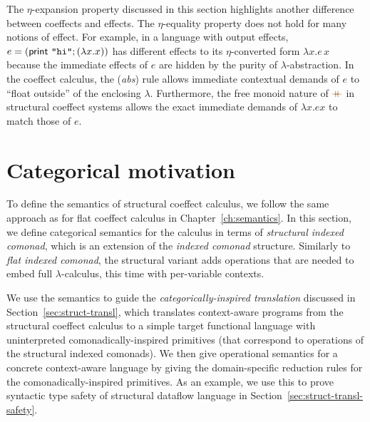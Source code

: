 \noindent
The $\eta$-expansion property discussed in this section highlights another difference
between coeffects and effects. The $\eta$-equality property does not hold for many notions
of effect. For example, in a language with output effects, $e = (\textsf{print \texttt{"hi"}}; (\lambda x . x))$
has different effects to its $\eta$-converted form $\lambda x . e\,x$ because the immediate
effects of $e$ are hidden by the purity of $\lambda$-abstraction. In the coeffect calculus,
the (\emph{abs}) rule allows immediate contextual demands of $e$ to ``float outside''
of the enclosing $\lambda$. Furthermore, the free monoid nature of $\atimes$ in structural
coeffect systems allows the exact immediate demands of $\lambda x . e x$ to match
those of $e$.



%
%

\section{Categorical motivation}
\label{sec:struct-semantics}

To define the semantics of structural coeffect calculus, we follow the same approach as for flat
coeffect calculus in Chapter~\ref{ch:semantics}. In this section, we define categorical semantics
for the calculus in terms of \emph{structural indexed comonad}, which is an extension of the
\emph{indexed comonad} structure. Similarly to \emph{flat indexed comonad}, the structural variant
adds operations that are needed to embed full $\lambda$-calculus, this time with per-variable contexts.

We use the semantics to guide the \emph{categorically-inspired translation} discussed in
Section~\ref{sec:struct-transl}, which translates context-aware programs from the structural coeffect
calculus to a simple target functional language with uninterpreted comonadically-inspired primitives
(that correspond to operations of the structural indexed comonads). We then give operational
semantics for a concrete context-aware language by giving the domain-specific reduction rules for
the comonadically-inspired primitives. As an example, we use this to prove syntactic type safety
of structural dataflow language in Section~\ref{sec:struct-transl-safety}.


